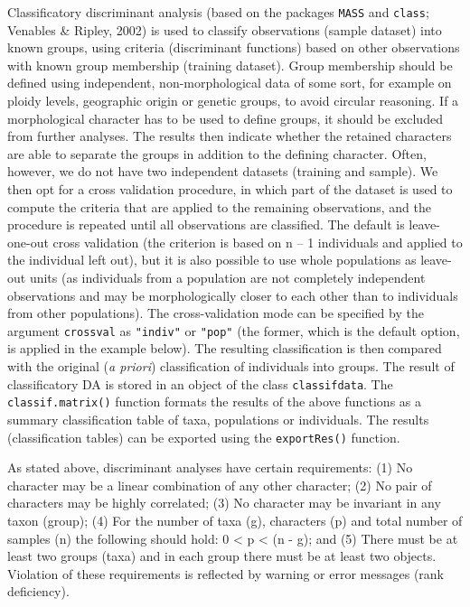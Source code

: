 \documentclass[
]{article}
\begin{document}
Classificatory discriminant analysis (based on the packages
\texttt{MASS} and \texttt{class}; Venables \& Ripley, 2002) is used to
classify observations (sample dataset) into known groups, using criteria
(discriminant functions) based on other observations with known group
membership (training dataset). Group membership should be defined using
independent, non-morphological data of some sort, for example on ploidy
levels, geographic origin or genetic groups, to avoid circular
reasoning. If a morphological character has to be used to define groups,
it should be excluded from further analyses. The results then indicate
whether the retained characters are able to separate the groups in
addition to the defining character. Often, however, we do not have two
independent datasets (training and sample). We then opt for a cross
validation procedure, in which part of the dataset is used to compute
the criteria that are applied to the remaining observations, and the
procedure is repeated until all observations are classified. The default
is leave-one-out cross validation (the criterion is based on n -- 1
individuals and applied to the individual left out), but it is also
possible to use whole populations as leave-out units (as individuals
from a population are not completely independent observations and may be
morphologically closer to each other than to individuals from other
populations). The cross-validation mode can be specified by the argument
\texttt{crossval} as \texttt{"indiv"} or \texttt{"pop"} (the former,
which is the default option, is applied in the example below). The
resulting classification is then compared with the original (\emph{a
priori}) classification of individuals into groups. The result of
classificatory DA is stored in an object of the class
\texttt{classifdata}. The \texttt{classif.matrix()} function formats the
results of the above functions as a summary classification table of
taxa, populations or individuals. The results (classification tables)
can be exported using the \texttt{exportRes()} function.

As stated above, discriminant analyses have certain requirements: (1) No
character may be a linear combination of any other character; (2) No
pair of characters may be highly correlated; (3) No character may be
invariant in any taxon (group); (4) For the number of taxa (g),
characters (p) and total number of samples (n) the following should
hold: 0 \textless{} p \textless{} (n - g); and (5) There must be at
least two groups (taxa) and in each group there must be at least two
objects. Violation of these requirements is reflected by warning or
error messages (rank deficiency).
\end{document}
